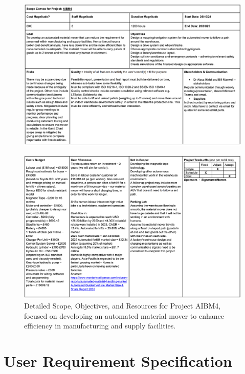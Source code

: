 \documentclass[12pt]{article}
\begin{document}
\begin{figure}[h!]
    \centering
    \includegraphics[width=1\textwidth]{scope1.png}
  \label{fig:Project Scope Document for AIBM4}
\end{figure}

\begin{figure}[h!]
    \centering
     \includegraphics[width=1\textwidth]{scope2.png}
        \caption{Detailed Scope, Objectives, and Resources for Project AIBM4, focused on developing an automated material mover to enhance efficiency in manufacturing and supply facilities.}
         \label{fig:Project Scope Document for AIBM4}
\end{figure}


  \section{User Requirement Specification}
\end{document}
